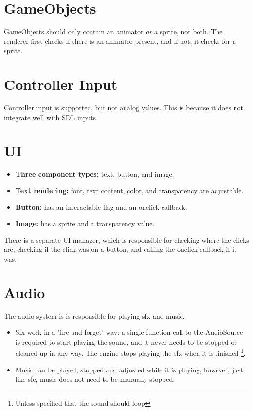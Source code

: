 \documentclass{article}
\begin{document}
\section{GameObjects}
GameObjects should only contain an animator \textit{or} a sprite, not both. The renderer first checks if there is an animator present, and if not, it checks for a sprite.

\section{Controller Input}
Controller input is supported, but not analog values. This is because it does not integrate well with SDL inputs.

\section{UI}
\begin{itemize}
  \item \textbf{Three component types:} text, button, and image.
  \item \textbf{Text rendering:} font, text content, color, and transparency are adjustable.
  \item \textbf{Button:} has an interactable flag and an onclick callback.
  \item \textbf{Image:} has a sprite and a transparency value.
\end{itemize}

\noindent
There is a separate UI manager, which is responsible for checking where the clicks are, checking if the click was on a button, and calling the onclick callback if it was.

\section{Audio}
The audio system is is responsible for playing sfx and music.
\begin{itemize}
  \item Sfx work in a 'fire and forget' way: a single function call to the AudioSource is required to start playing the sound, and it never needs to be stopped or cleaned up in any way. The engine stops playing the sfx when it is finished \footnote{Unless specified that the sound should loop}.
  \item Music can be played, stopped and adjusted while it is playing, however, just like sfc, music does not need to be manually stopped.
\end{itemize}
\end{document}
